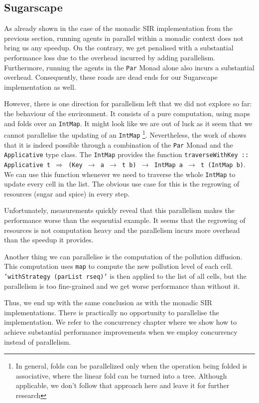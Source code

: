 \subsection{Sugarscape}
As already shown in the case of the monadic SIR implementation from the previous section, running agents in parallel within a monadic context does not bring us any speedup. On the contrary, we get penalised with a substantial performance loss due to the overhead incurred by adding parallelism. Furthermore, running the agents in the \texttt{Par} Monad alone also incurs a substantial overhead. Consequently, these roads are dead ends for our Sugarscape implementation as well.

However, there is one direction for parallelism left that we did not explore so far: the behaviour of the environment. It consists of a pure computation, using maps and folds over an \texttt{IntMap}. It might look like we are out of luck as it seem that we cannot parallelise the updating of an \texttt{IntMap} \footnote{In general, folds can be parallelized only when the operation being folded is associative, where the linear fold can be turned into a tree. Although applicable, we don't follow that approach here and leave it for further research}. Nevertheless, the work of \cite{marlow_parallel_2013} shows that it is indeed possible through a combination of the \texttt{Par} Monad and the \texttt{Applicative} type class. The \texttt{IntMap} provides the function \texttt{traverseWithKey :: Applicative t $\Rightarrow$ (Key $\rightarrow$ a $\rightarrow$ t b) $\rightarrow$ IntMap a $\rightarrow$ t (IntMap b)}. We can use this function whenever we need to traverse the whole \texttt{IntMap} to update every cell in the list. The obvious use case for this is the regrowing of resources (sugar and spice) in every step.

Unfortunately, measurements quickly reveal that this parallelism makes the performance worse than the sequential example. It seems that the regrowing of resources is not computation heavy and the parallelism incurs more overhead than the speedup it provides.

Another thing we can parallelise is the computation of the pollution diffusion. This computation uses \texttt{map} to compute the new pollution level of each cell. \texttt{'withStrategy (parList rseq)'} is then applied to the list of all cells, but the parallelism is too fine-grained and we get worse performance than without it.

Thus, we end up with the same conclusion as with the monadic SIR implementations. There is practically no opportunity to parallelise the implementation. We refer to the concurrency chapter where we show how to achieve substantial performance improvements when we employ concurrency instead of parallelism.